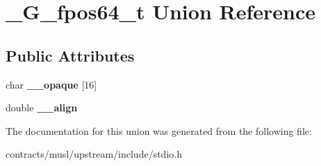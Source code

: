 \hypertarget{union___g__fpos64__t}{}\section{\+\_\+\+G\+\_\+fpos64\+\_\+t Union Reference}
\label{union___g__fpos64__t}
\subsection*{Public Attributes}
\begin{DoxyCompactItemize}
\item 
\mbox{\label{union___g__fpos64__t_ae8e838a173e021240f887d365ca9d7d7}} 
char {\bfseries \+\_\+\+\_\+opaque} \mbox{[}16\mbox{]}
\item 
\mbox{\label{union___g__fpos64__t_a7d2eb091e7e58f21842bd703b663184d}} 
double {\bfseries \+\_\+\+\_\+align}
\end{DoxyCompactItemize}


The documentation for this union was generated from the following file\+:\begin{DoxyCompactItemize}
\item 
contracts/musl/upstream/include/stdio.\+h\end{DoxyCompactItemize}
